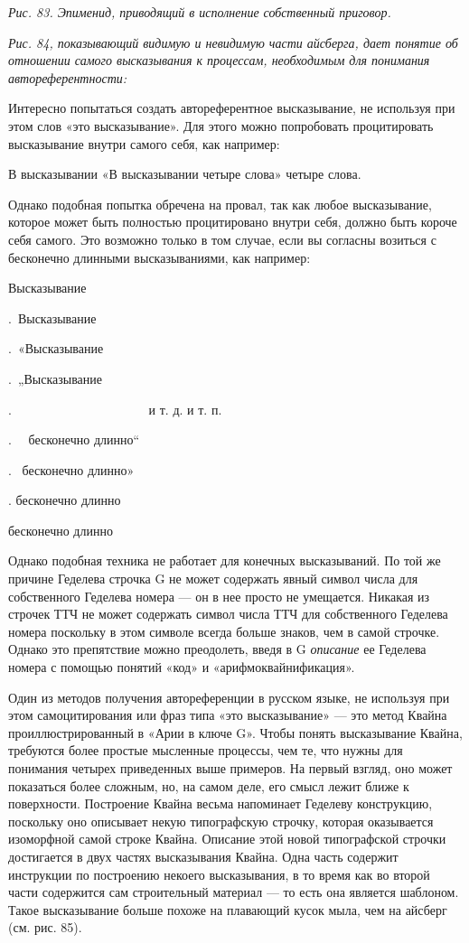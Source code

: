 \emph{Рис. 83. Эпименид, приводящий в исполнение собственный приговор.}

\emph{Рис. 84, показывающий видимую и невидимую части айсберга, дает понятие об отношении самого высказывания к процессам, необходимым для понимания автореферентности:}

Интересно попытаться создать автореферентное высказывание, не используя при этом слов «это высказывание». Для этого можно попробовать процитировать высказывание внутри самого себя, как например:

В высказывании «В высказывании четыре слова» четыре слова.

Однако подобная попытка обречена на провал, так как любое высказывание, которое может быть полностью процитировано внутри себя, должно быть короче себя самого. Это возможно только в том случае, если вы согласны возиться с бесконечно длинными высказываниями, как например:

Высказывание

.~Высказывание

.~«Высказывание

.~„Высказывание

.~~~~~~~~~~~~~~~~~~~~~ и т. д. и т. п.

.~~ бесконечно длинно``

.~ бесконечно длинно»

. бесконечно длинно

бесконечно длинно

Однако подобная техника не работает для конечных высказываний. По той же причине Геделева строчка G не может содержать явный символ числа для собственного Геделева номера --- он в нее просто не умещается. Никакая из строчек ТТЧ не может содержать символ числа ТТЧ для собственного Геделева номера поскольку в этом символе всегда больше знаков, чем в самой строчке. Однако это препятствие можно преодолеть, введя в G \emph{описание} ее Геделева номера с помощью понятий «код» и «арифмоквайнификация».

Один из методов получения автореференции в русском языке, не используя при этом самоцитирования или фраз типа «это высказывание» --- это метод Квайна проиллюстрированный в «Арии в ключе G». Чтобы понять высказывание Квайна, требуются более простые мысленные процессы, чем те, что нужны для понимания четырех приведенных выше примеров. На первый взгляд, оно может показаться более сложным, но, на самом деле, его смысл лежит ближе к поверхности. Построение Квайна весьма напоминает Геделеву конструкцию, поскольку оно описывает некую типографскую строчку, которая оказывается изоморфной самой строке Квайна. Описание этой новой типографской строчки достигается в двух частях высказывания Квайна. Одна часть содержит инструкции по построению некоего высказывания, в то время как во второй части содержится сам строительный материал --- то есть она является шаблоном. Такое высказывание больше похоже на плавающий кусок мыла, чем на айсберг (см. рис. 85).

